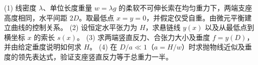 (1) 线密度 \(\lambda\)、单位长度重量 \(w=\lambda g\) 的柔软不可伸长索在均匀重力下，两端支座高度相同，水平间距 \(2D\)。取最低点 \(x=y=0\)，并假定仅受自重。由微元平衡建立曲线的控制关系。
(2) 设恒定水平张力为 \(H\)，求悬链线 \(y(x)\) 以及从最低点到横坐标 \(x\) 的索长 \(s(x)\)。
(3) 求两端竖直反力、合张力大小及垂度 \(f=y(D)\)，并由给定垂度说明如何求 \(H\)。
(4) 在 \(D/a\ll1\)（\(a=H/w\)）时求抛物线近似及垂度的领先表达式，验证支座竖直反力等于总重力一半。
